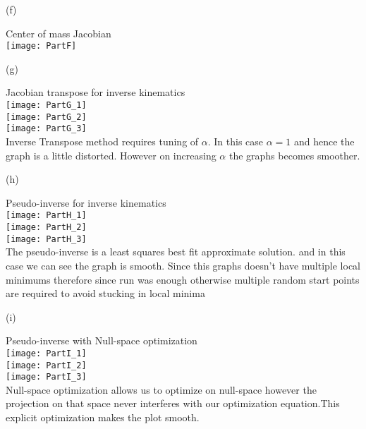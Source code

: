 \documentclass[12pt]{article}
\newenvironment{problem}[2][Problem]{\begin{trivlist}
\item[\hskip \labelsep {\bfseries #1}\hskip \labelsep {\bfseries #2.}]}{\end{trivlist}}
\begin{document}
\clearpage
\begin{problem} 1 (f)
\end{problem}
\begin{Answer}
Center of mass Jacobian\\
\vspace{2mm}
\texttt{[image: PartF]}
\end{Answer}

\clearpage
\begin{problem} 1 (g)
\end{problem}
\begin{Answer}
Jacobian transpose for inverse kinematics\\
\texttt{[image: PartG\_1]}\\
\vspace{2mm}
\texttt{[image: PartG\_2]}\\
\vspace{2mm}
\texttt{[image: PartG\_3]}\\
Inverse Transpose method requires tuning of $\alpha$. In this case $\alpha = 1$ and hence the graph is a little distorted. However on increasing $\alpha$ the graphs becomes smoother. 
\end{Answer}

\clearpage
\begin{problem} 1 (h)
\end{problem}
\begin{Answer}
Pseudo-inverse for inverse kinematics\\
\texttt{[image: PartH\_1]}\\
\vspace{2mm}
\texttt{[image: PartH\_2]}\\
\vspace{2mm}
\texttt{[image: PartH\_3]}\\
The pseudo-inverse is a least squares best fit approximate solution. and in this case we can see the graph is smooth. Since this graphs doesn't have multiple local minimums therefore since run was enough otherwise multiple random start points are required to avoid stucking in local minima
\end{Answer}

\clearpage
\begin{problem} 1 (i)
\end{problem}
\begin{Answer}
Pseudo-inverse with Null-space optimization\\
\texttt{[image: PartI\_1]}\\
\vspace{2mm}
\texttt{[image: PartI\_2]}\\
\vspace{2mm}
\texttt{[image: PartI\_3]}\\
Null-space optimization allows us to optimize on null-space however the projection on that space never interferes with our optimization equation.This explicit optimization makes the plot smooth.
\end{Answer}
\end{document}
